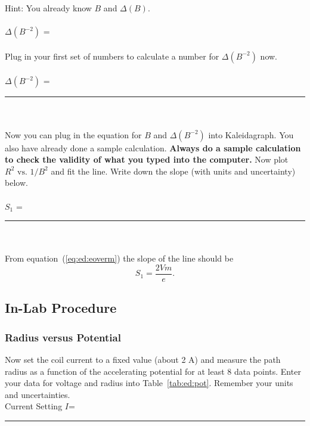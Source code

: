 Hint: You already know $B$ and $\Delta(B)$.  \\
\vspace*{3cm} \\
\hspace*{5cm} $\Delta(B^{-2})$ = \\
\ \\
\noindent Plug in your first set of numbers to calculate a  number for 
$\Delta(B^{-2})$ now.  \\
\vspace*{1cm} \\
\hspace*{5cm} $\Delta(B^{-2})$ =~\rule{3cm}{.1mm} \\
\ \\
\noindent Now you can plug in the equation for $B$ and $\Delta(B^{-2})$
into Kaleidagraph.  You also have already done a sample
calculation.   {\bf Always do a sample calculation
to check the validity of what you typed into the computer.}  Now plot
$R^2 \mbox{ vs. } 1/B^2$ and fit the line.
Write down the slope (with units and uncertainty) below. \\
\ \\
\hspace*{5cm} $S_1$ =~\rule{3cm}{.1mm}\\ 
\ \\
\noindent From equation~(\ref{eq:ed:eoverm}) the slope of the line should be $$S_1=\frac{2Vm}{e}.$$


\subsection{In-Lab Procedure}
\subsubsection{Radius versus Potential}
\label{sec:ed:pot}

Now set the coil current to a fixed value (about 2 A) and measure the 
path radius as a function of the accelerating potential for at least 
8 data points.  Enter your data for voltage and radius into 
Table~\ref{tab:ed:pot}.  Remember
your units and uncertainties.\\

\hspace{3cm} Current Setting  $I$=~\rule{3cm}{.1mm}

